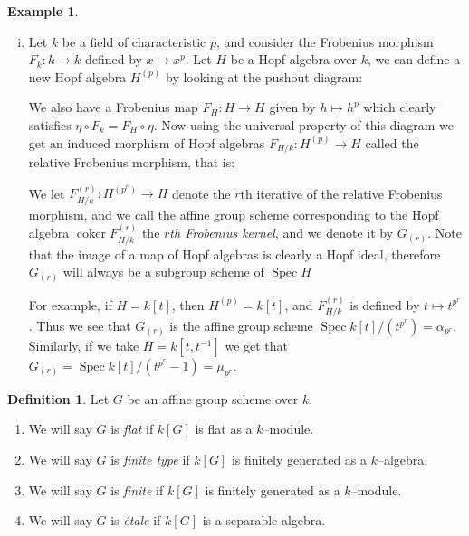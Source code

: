 \documentclass{article}
\theoremstyle{plain}
\theoremstyle{definition}
\newtheorem{Def}[Th]{Definition}
\newtheorem{Ex}[Th]{Example}
\DeclareMathOperator{\coker}{coker}
\DeclareMathOperator{\Spec}{Spec}
\begin{document}
\begin{Ex}
\begin{enumerate}[(i)]
      \item Let $k$ be a field of characteristic $p$, and consider the Frobenius morphism $F_k: k\to k$ defined by $x\mapsto x^p$. Let $H$ be a Hopf algebra over $k$, we can define a new Hopf algebra $H^{(p)}$ by looking at the pushout diagram:
    \begin{center}
    \end{center}
    We also have a Frobenius map $F_H:H\to H$ given by $h\mapsto h^p$ which clearly satisfies $\eta \circ F_k= F_H \circ \eta$. Now using the universal property of this diagram we get an induced morphism of Hopf algebras $F_{H/k}: H^{(p)}\to H$ called the {relative Frobenius morphism}, that is:
        \begin{center}
    \end{center}
    We let $F_{H/k}^{(r)}:H^{(p^r)}\to H$ denote the $r$th iterative of the relative Frobenius morphism, and we call the affine group scheme corresponding to the Hopf algebra $\coker F_{H/k}^{(r)}$ the $r$\textit{th Frobenius kernel}, and we denote it by $G_{(r)}$. Note that the image of a map of Hopf algebras is clearly a Hopf ideal, therefore $G_{(r)}$ will always be a subgroup scheme of $\Spec H$

    For example, if $H=k[t]$, then $H^{(p)}=k[t]$, and $F^{(r)}_{H/k}$ is defined by $t\mapsto t^{p^r}$. Thus we see that $G_{(r)}$ is the affine group scheme $\Spec k[t]/(t^{p^r})=\alpha_{p^r}$. Similarly, if we take $H=k[t, t^{-1}]$ we get that $G_{(r)}=\Spec k[t]/(t^{p^r}-1)=\mu_{p^r}$.
    \end{enumerate}
\end{Ex}


 \begin{Def}
     Let $G$ be an affine group scheme over $k$. 
     \begin{enumerate}
         \item We will say $G$ is \textit{flat} if $k[G]$ is flat as a $k$--module.
         \item We will say $G$ is \textit{finite type} if $k[G]$ is finitely generated as a $k$--algebra.
         \item We will say $G$ is \textit{finite} if $k[G]$ is finitely generated as a $k$--module.
         \item We will say $G$ is \textit{\'etale} if $k[G]$ is a separable algebra.
     \end{enumerate}
 \end{Def}
\end{document}
